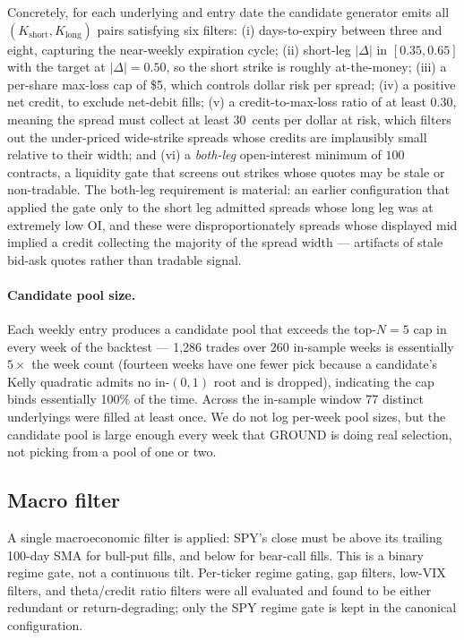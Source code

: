 \documentclass[11pt]{article}
\begin{document}
Concretely, for each underlying and entry date the candidate generator
emits all $(K_{\text{short}}, K_{\text{long}})$ pairs satisfying six
filters: (i) days-to-expiry between three and eight, capturing the
near-weekly expiration cycle; (ii) short-leg $|\Delta|$ in
$[0.35, 0.65]$ with the target at $|\Delta| = 0.50$, so the short
strike is roughly at-the-money; (iii) a per-share max-loss cap of \$5,
which controls dollar risk per spread; (iv) a positive net credit, to
exclude net-debit fills; (v) a credit-to-max-loss ratio of at least
$0.30$, meaning the spread must collect at least 30~cents per dollar
at risk, which filters out the under-priced wide-strike spreads whose
credits are implausibly small relative to their width; and (vi) a
\emph{both-leg} open-interest minimum of $100$ contracts, a liquidity
gate that screens out strikes whose quotes may be stale or
non-tradable. The both-leg requirement is material: an earlier
configuration that applied the gate only to the short leg admitted
spreads whose long leg was at extremely low OI, and these were
disproportionately spreads whose displayed mid implied a credit
collecting the majority of the spread width --- artifacts of stale
bid-ask quotes rather than tradable signal.

\paragraph{Candidate pool size.}
Each weekly entry produces a candidate pool that exceeds the top-$N=5$
cap in every week of the backtest --- 1{,}286 trades over 260 in-sample
weeks is essentially $5\times$ the week count (fourteen weeks have one
fewer pick because a candidate's Kelly quadratic admits no in-$(0,1)$
root and is dropped), indicating the cap binds essentially 100\%
of the time. Across the in-sample window 77 distinct underlyings were
filled at least once. We do not log per-week pool sizes, but the
candidate pool is large enough every week that GROUND is doing real
selection, not picking from a pool of one or two.

\subsection{Macro filter}

A single macroeconomic filter is applied: SPY's close must be above its
trailing 100-day SMA for bull-put fills, and below for bear-call fills.
This is a binary regime gate, not a continuous tilt. Per-ticker regime
gating, gap filters, low-VIX filters, and theta/credit ratio filters
were all evaluated and found to be either redundant or
return-degrading; only the SPY regime gate is kept in the canonical
configuration.
\end{document}
